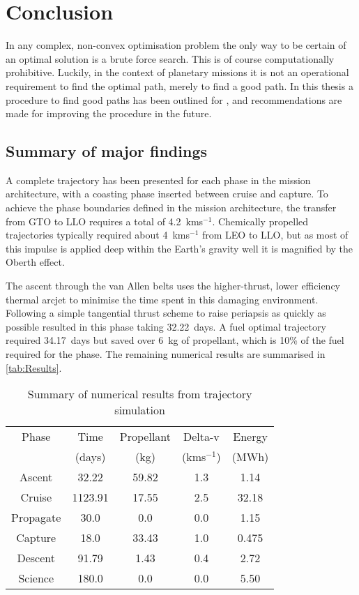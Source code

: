 \chapter{Conclusion} \label{cha:Conclusion}

In any complex, non-convex optimisation problem the only way to be certain of an optimal solution is a brute force search. This is of course computationally prohibitive. Luckily, in the context of planetary missions it is not an operational requirement to find the optimal path, merely to find a good path. In this thesis a procedure to find good paths has been outlined for \BW, and recommendations are made for improving the procedure in the future.

\section{Summary of major findings}

A complete trajectory has been presented for each phase in the mission architecture, with a coasting phase inserted between cruise and capture. To achieve the phase boundaries defined in the mission architecture, the transfer from GTO to LLO requires a total of 4.2~kms$^{-1}$. Chemically propelled trajectories typically required about 4~kms$^{-1}$ from LEO to LLO, but as most of this impulse is applied deep within the Earth's gravity well it is magnified by the Oberth effect.

The ascent through the van Allen belts uses the higher-thrust, lower efficiency thermal arcjet to minimise the time spent in this damaging environment. Following a simple tangential thrust scheme to raise periapsis as quickly as possible resulted in this phase taking 32.22~days. A fuel optimal trajectory required 34.17~days but saved over 6~kg of propellant, which is 10\% of the fuel required for the phase. The remaining numerical results are summarised in \autoref{tab:Results}.

\begin{table}
\caption{Summary of numerical results from trajectory simulation}
\label{tab:Results}
\centering
\begin{tabular}{ccccc} \toprule
Phase & Time & Propellant & Delta-v & Energy \tabularnewline
& (days) & (kg) & (kms$^{-1}$) & (MWh) \tabularnewline\midrule
Ascent & 32.22 & 59.82 & 1.3 & 1.14 \tabularnewline
Cruise & 1123.91 & 17.55 & 2.5 & 32.18 \tabularnewline
Propagate & 30.0 & 0.0 & 0.0 & 1.15 \tabularnewline
Capture &18.0 & 33.43 & 1.0 & 0.475 \tabularnewline
Descent & 91.79 & 1.43 & 0.4 & 2.72 \tabularnewline
Science &180.0 & 0.0 & 0.0 & 5.50 \tabularnewline\bottomrule
\end{tabular}
\end{table}

